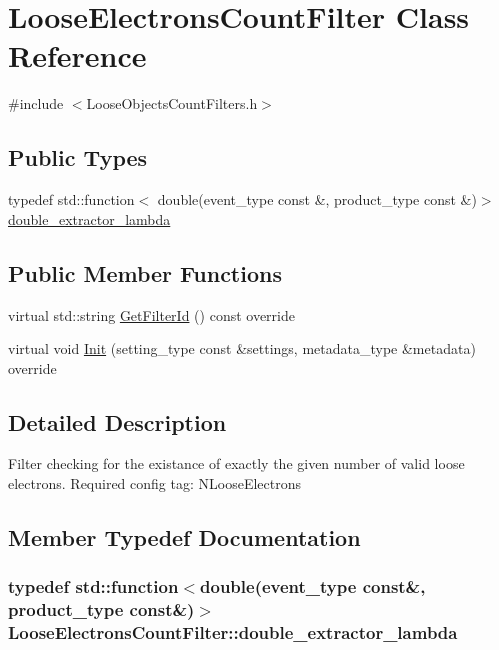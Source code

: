 \hypertarget{classLooseElectronsCountFilter}{
\section{LooseElectronsCountFilter Class Reference}
\label{classLooseElectronsCountFilter}
}


{\ttfamily \#include $<$LooseObjectsCountFilters.h$>$}\subsection*{Public Types}
\begin{DoxyCompactItemize}
\item 
typedef std::function$<$ double(event\_\-type const \&, product\_\-type const \&)$>$ \hyperlink{classLooseElectronsCountFilter_a614a004e9b827d6af0528a9f35c8f125}{double\_\-extractor\_\-lambda}
\end{DoxyCompactItemize}
\subsection*{Public Member Functions}
\begin{DoxyCompactItemize}
\item 
virtual std::string \hyperlink{classLooseElectronsCountFilter_a44f431ff35de350eee4c35bdf2c65ca8}{GetFilterId} () const override
\item 
virtual void \hyperlink{classLooseElectronsCountFilter_ac1b0f92669ffa2c61805d4fe3a5c124c}{Init} (setting\_\-type const \&settings, metadata\_\-type \&metadata) override
\end{DoxyCompactItemize}


\subsection{Detailed Description}
Filter checking for the existance of exactly the given number of valid loose electrons. Required config tag: NLooseElectrons 

\subsection{Member Typedef Documentation}
\hypertarget{classLooseElectronsCountFilter_a614a004e9b827d6af0528a9f35c8f125}{
\subsubsection[{double\_\-extractor\_\-lambda}]{\setlength{\rightskip}{0pt plus 5cm}typedef std::function$<$double(event\_\-type const\&, product\_\-type const\&)$>$ {\bf LooseElectronsCountFilter::double\_\-extractor\_\-lambda}}}
\label{classLooseElectronsCountFilter_a614a004e9b827d6af0528a9f35c8f125}


